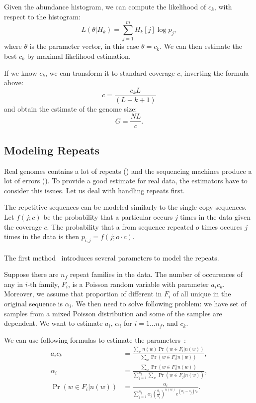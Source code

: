 Given the abundance histogram, we can compute the likelihood of $c_k$, with respect to the histogram:
$$L(\theta | H_k) = \sum_{j=1}^m H_k[j] \log p_j,$$
where $\theta$ is the parameter vector, in this case $\theta = c_k$.
We can then estimate the best $c_k$ by maximal likelihood estimation.

If we know $c_k$, we can transform it to standard coverage $c$, inverting the formula above:
$$c = \frac{c_k L}{(L - k + 1)}$$
and obtain the estimate of the genome size:
$$G = \frac{NL}{c}.$$

\subsection{Modeling Repeats}\label{subsec:repeatmodles}

Real genomes contains a lot of repeats () and the sequencing machines produce a lot of errors (). To provide a good estimate for real data, the estimators have to consider this issues. Let us deal with handling repeats first.

The repetitive sequences can be modeled similarly to the single copy sequences. Let $f(j; c)$ be the probability that a particular \kmer occurs $j$ times in the data given the coverage $c$. The probability that a \kmer from sequence repeated $o$ times occures $j$ times in the data is then $p_{i,j} = f(j; o\cdot c)$.

\paragraph{}The first method~\cite{waterman} introduces several parameters to model the repeats.

Suppose there are $n_f$ repeat families in the data. The number of occurences of any \kmer in $i$-th family, $F_i$, is a Poisson random variable with parameter $a_i c_k$. Moreover, we assume that proportion of different \kmers in $F_i$ of all unique \kmers in the original sequence is $\alpha_i$.
We then need to solve following problem: we have set of samples from a mixed Poisson distribution and some of the samples are dependent. We want to estimate $a_i,\,\alpha_i$ for $i = 1\dots n_f$, and $c_k$.

We can use following formulas to estimate the parameters~\cite{waterman}:
\begin{align*}
a_i c_k & = \frac{\displaystyle\sum_w n(w) \Pr(w \in F_i | n(w))}{\displaystyle\sum_w \Pr(w \in F_i | n(w))},\\[1.5ex]
\alpha_i & = \frac{\displaystyle\sum_w \Pr(w \in F_i | n(w))}{\displaystyle\sum_{j=1}^{n_f}\sum_w \Pr(w \in F_j | n(w))},\\[1.5ex]
\Pr(w \in F_i | n(w)) & = \frac{\alpha_i}{\displaystyle\sum_{j=1}^{n_f} \alpha_j {\left(\frac{a_j}{a_i}\right)}^{n(w)} e^{(\alpha_i-a_j)c_k}}.
\end{align*}

